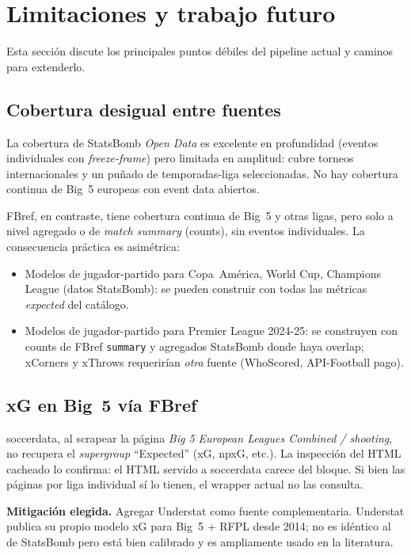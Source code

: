 \section{Limitaciones y trabajo futuro}
\label{sec:limitaciones}

Esta sección discute los principales puntos débiles del pipeline actual y caminos para extenderlo.

\subsection{Cobertura desigual entre fuentes}

La cobertura de StatsBomb \emph{Open Data} es excelente en profundidad (eventos individuales con \emph{freeze-frame}) pero limitada en amplitud: cubre torneos internacionales y un puñado de temporadas-liga seleccionadas. No hay cobertura continua de Big~5 europeas con event data abiertos.

FBref, en contraste, tiene cobertura continua de Big~5 y otras ligas, pero solo a nivel agregado o de \emph{match summary} (counts), sin eventos individuales. La consecuencia práctica es asimétrica:

\begin{itemize}[noitemsep]
  \item Modelos de jugador-partido para Copa~América, World Cup, Champions League (datos StatsBomb): se pueden construir con todas las métricas \emph{expected} del catálogo.
  \item Modelos de jugador-partido para Premier League 2024-25: se construyen con counts de FBref \texttt{summary} y agregados StatsBomb donde haya overlap; xCorners y xThrows requerirían \emph{otra} fuente (WhoScored, API-Football pago).
\end{itemize}

\subsection{xG en Big~5 vía FBref}

soccerdata, al scrapear la página \emph{Big 5 European Leagues Combined / shooting}, no recupera el \emph{supergroup} ``Expected'' (xG, npxG, etc.). La inspección del HTML cacheado lo confirma: el HTML servido a soccerdata carece del bloque. Si bien las páginas por liga individual sí lo tienen, el wrapper actual no las consulta.

\textbf{Mitigación elegida.} Agregar Understat como fuente complementaria. Understat publica su propio modelo xG para Big~5 + RFPL desde 2014; no es idéntico al de StatsBomb pero está bien calibrado y es ampliamente usado en la literatura.

